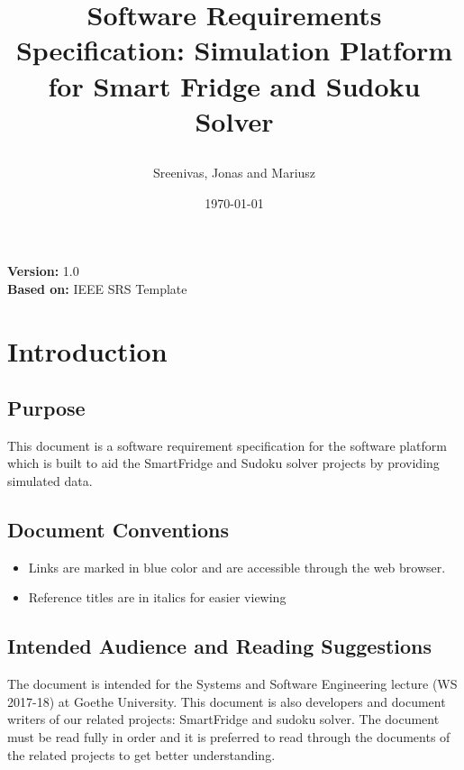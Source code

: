 \documentclass[a4paper,12pt]{article}
\begin{document}



\title{\begin{Huge}
\textbf{Software Requirements Specification: Simulation Platform for Smart Fridge and Sudoku Solver}
\end{Huge}}
\author{\begin{Large}
Sreenivas, Jonas and Mariusz
\end{Large}}
\date{\today}
\maketitle
\thispagestyle{empty}
\begin{center}
\begin{large}
\textbf{Version:} 1.0
\\  \textbf{Based on:} IEEE SRS Template
\end{large}
\end{center}
\newpage
\tableofcontents \newpage
{}
\section{Introduction}
\subsection{Purpose}
This document is a software requirement specification for the software platform which is built to aid the SmartFridge and Sudoku solver projects by providing simulated data.
\subsection{Document Conventions}
\begin{itemize}
\item Links are marked in blue color and are accessible through the web browser.
\item Reference titles are in italics for easier viewing
\end{itemize}
\subsection{Intended Audience and Reading Suggestions}
The document is intended for the Systems and Software Engineering lecture (WS 2017-18) at Goethe University. This document is also developers and document writers of our related projects: SmartFridge and sudoku solver. The document must be read fully in order and it is preferred to read through the documents of the related projects to get better understanding.
\end{document}

